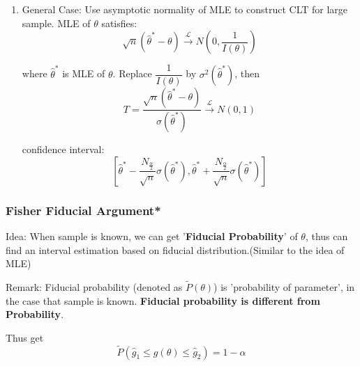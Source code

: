 \begin{enumerate}


    
    \item General Case: Use asymptotic normality of MLE to construct CLT for large sample. MLE of $\theta$ satisfies:
    \[
        \sqrt{n}(\hat{\theta}^*-\theta)\xrightarrow[]{\mathscr{L}}N(0,\frac{1}{I(\theta)})
    \]

    where $\hat{\theta}^*$ is MLE of $\theta$. Replace $\dfrac{1}{I(\theta)}$ by $\sigma^2(\hat{\theta}^*)$, then
    \[
        T=\frac{\sqrt{n}(\hat{\theta}^*-\theta)}{\sigma(\hat{\theta}^*)}\xrightarrow[]{\mathscr{L}}N(0,1)    
    \]

    confidence interval:
    \[
        \left[\hat{\theta}^*-\frac{N_{\frac{\alpha}{2}}}{\sqrt{n}}\sigma(\hat{\theta}^*),\hat{\theta}^*+\frac{N_{\frac{\alpha}{2}}}{\sqrt{n}}\sigma(\hat{\theta}^*)\right]
    \]
    \end{enumerate}

\subsubsection{Fisher Fiducial Argument*}\label{SubSectionFisherFiducialArgument}
    Idea: When sample is known, we can get '\textbf{Fiducial Probability}' of $\theta$, thus can find an interval estimation based on fiducial distribution.(Similar to the idea of MLE)

    Remark: Fiducial probability (denoted as $\tilde{P}(\theta)$) is 'probability of parameter', in the case that sample is known. \textbf{Fiducial probability is different from Probability}.

    Thus get
    \[
        \tilde{P}(\hat{g}_1\leq g(\theta)\leq \hat{g}_2)=1-\alpha
    \]







